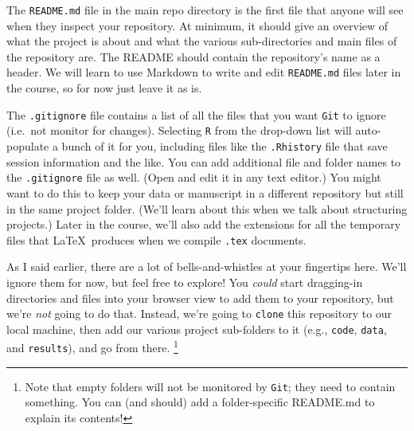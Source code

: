 \documentclass[12pt,letterpaper]{article}
\begin{document}
\begin{tcolorbox}[breakable, enhanced, before upper={\parindent15pt}]
	\noindent
	The \texttt{README.md} file in the main repo directory is the first file that 
	anyone will see when they inspect your repository.
	At minimum, it should give an overview of what the project is about and what 
	the various sub-directories and main files of the repository are.
	The README should contain the repository's name as a header.
	We will learn to use Markdown to write and edit \texttt{README.md} files 
	later in the course, so for now just leave it as is.
\end{tcolorbox}

\begin{tcolorbox}[breakable, enhanced, before upper={\parindent15pt}]
	\noindent
	The \texttt{.gitignore} file contains a list of all the files that you want \texttt{Git} 
	to ignore
	(i.e.~not monitor for changes).
	Selecting \texttt{R} from the drop-down list will auto-populate a bunch of it for 
	you, 
	including files like the \texttt{.Rhistory} file that save session information and 
	the like.
	You can add additional file and folder names to the \texttt{.gitignore} file as 
	well.  (Open and edit it in any text editor.)
	You might want to do this to keep your data or manuscript in a different 
	repository but still in the same project folder. 
	(We'll learn about this when we talk about structuring projects.)
	Later in the course,
	we'll also add the extensions for all the temporary files that \LaTeX\ produces 
	when we compile \texttt{.tex} documents.
\end{tcolorbox}

As I said earlier, there are a lot of bells-and-whistles at your fingertips here.
We'll ignore them for now, but feel free to explore!
You \emph{could} start dragging-in directories and files into your browser view 
to add them to your repository, 
but we're \emph{not} going to do that.
Instead, we're going to \texttt{clone} this repository to our local machine, 
then add our various project sub-folders to it
(e.g., \texttt{code}, \texttt{data}, and \texttt{results}), 
and go from there.
\unskip
\footnote{
	Note that empty folders will not be monitored by \texttt{Git}; 
	they need to contain something.
	You can (and should) add a folder-specific README.md to explain its contents!}
\end{document}
